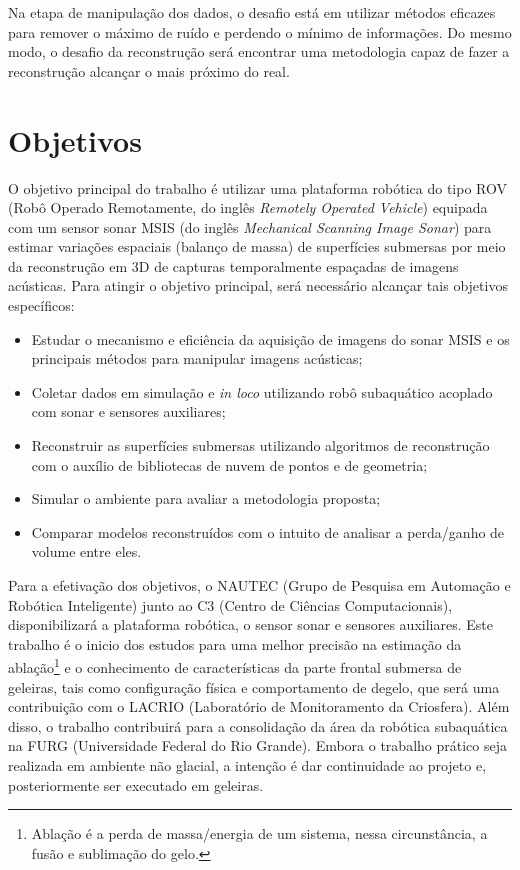 Na etapa de manipulação dos dados, o desafio está em utilizar métodos eficazes para remover o máximo de ruído e perdendo o mínimo de informações.
Do mesmo modo, o desafio da reconstrução será encontrar uma metodologia capaz de fazer a reconstrução alcançar o mais próximo do real.


\section{Objetivos}
\label{sec:objetivos}

O objetivo principal do trabalho é utilizar uma plataforma robótica do tipo ROV (Robô Operado Remotamente, do inglês \textit{Remotely Operated Vehicle}) equipada com um sensor sonar MSIS (do inglês \textit{Mechanical Scanning Image Sonar}) para estimar variações espaciais (balanço de massa) de superfícies submersas por meio da reconstrução em 3D de capturas temporalmente espaçadas de imagens acústicas. 
Para atingir o objetivo principal, será necessário alcançar tais objetivos específicos:

\begin{itemize}
    \item Estudar o mecanismo e eficiência da aquisição de imagens do sonar MSIS e os principais métodos para manipular imagens acústicas;
    \item Coletar dados em simulação e \textit{in loco} utilizando robô subaquático acoplado com sonar e sensores auxiliares;
    \item Reconstruir as superfícies submersas utilizando algoritmos de reconstrução com o auxílio de bibliotecas de nuvem de pontos e de geometria;
    \item Simular o ambiente para avaliar a metodologia proposta;
    \item Comparar modelos reconstruídos com o intuito de analisar a perda/ganho de volume entre eles.
\end{itemize}
\hspace{1em}

Para a efetivação dos objetivos, o NAUTEC (Grupo de Pesquisa em Automação e Robótica Inteligente) junto ao C3 (Centro de Ciências Computacionais), disponibilizará a plataforma robótica, o sensor sonar e sensores auxiliares. Este trabalho é o inicio dos estudos para uma melhor precisão na estimação da ablação\footnote{Ablação é a perda de massa/energia de um sistema, nessa circunstância, a fusão e sublimação do gelo.} e o conhecimento de características da parte frontal submersa de geleiras, tais como configuração física e comportamento de degelo, que será uma contribuição com o LACRIO (Laboratório de Monitoramento da Criosfera). Além disso, o trabalho contribuirá para a consolidação da área da robótica subaquática na FURG (Universidade Federal do Rio Grande).
Embora o trabalho prático seja realizada em ambiente não glacial, a intenção é dar continuidade ao projeto e, posteriormente ser executado em geleiras.



